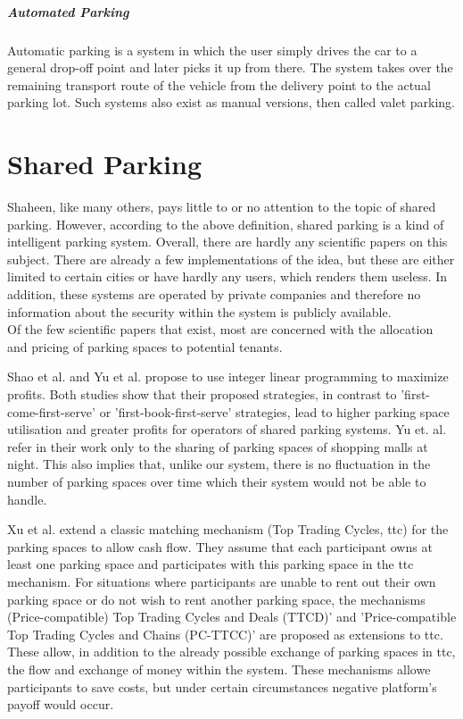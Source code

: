\subparagraph{Automated Parking}
Automatic parking is a system in which the user simply drives the car to a general drop-off point and later picks it up from there. The system takes over the remaining transport route of the vehicle from the delivery point to the actual parking lot. Such systems also exist as manual versions, then called valet parking.

\section{Shared Parking}
Shaheen, like many others, pays little to or no attention to the topic of shared parking. However, according to the above definition, shared parking is a kind of intelligent parking system. Overall, there are hardly any scientific papers on this subject. There are already a few implementations of the idea, but these are either limited to certain cities or have hardly any users, which renders them useless. In addition, these systems are operated by private companies and therefore no information about the security within the system is publicly available.\\

Of the few scientific papers that exist, most are concerned with the allocation and pricing of parking spaces to potential tenants.

Shao et al. \cite{shao2016simple} and Yu et al. \cite{yu2018optimal} propose to use integer linear programming to maximize profits. Both studies show that their proposed strategies, in contrast to 'first-come-first-serve' or 'first-book-first-serve' strategies, lead to higher parking space utilisation and greater profits for operators of shared parking systems. Yu et. al. refer in their work only to the sharing of parking spaces of shopping malls at night. This also implies that, unlike our system, there is no fluctuation in the number of parking spaces over time which their system would not be able to handle.

Xu et al. \cite{xu2016private} extend a classic matching mechanism (Top Trading Cycles, ttc) for the parking spaces to allow cash flow. They assume that each participant owns at least one parking space and participates with this parking space in the ttc mechanism. For situations where participants are unable to rent out their own parking space or do not wish to rent another parking space, the mechanisms (Price-compatible) Top Trading Cycles and Deals (TTCD)' and 'Price-compatible Top Trading Cycles and Chains (PC-TTCC)' are proposed as extensions to ttc. These allow, in addition to the already possible exchange of parking spaces in ttc, the flow and exchange of money within the system. These mechanisms allowe participants to save costs, but under certain circumstances negative platform's payoff would occur. 

